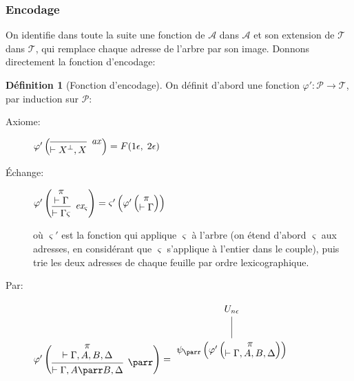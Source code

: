 \documentclass[11pt,a4paper]{article}
\theoremstyle{plain}
\theoremstyle{definition}
\newtheorem{definition}{Définition}
\theoremstyle{remark}
\newcommand*{\orth}{^\perp}
\newcommand*{\namedproofv}[2]{\hypo{#1}\infer[no rule]{1}{\vdash #2}}
\newcommand*{\axv}[1]{\infer{0}[\ensuremath{\mathit{ax}}]{\vdash #1}}
\newcommand*{\parrv}[1]{\infer{1}[\ensuremath{\parr}]{\vdash #1}}
\newcommand*{\permv}[2]{\infer{1}[\ensuremath{\textit{ex}_{#1}}]{\vdash #2}}
\newcommand*{\permapp}[2]{#2 #1}
\newcommand*{\someperm}{\varsigma}
\newcommand*{\sequent}{\Gamma}
\newcommand*{\sequentbis}{\Delta}
\newcommand*{\proofs}{\ensuremath{\mathcal{P}}}
\newcommand*{\addresses}{\ensuremath{\mathcal{A}}}
\newcommand*{\trees}{\ensuremath{\mathcal{T}}}
\newcommand*{\encode}{\ensuremath{\varphi}}
\begin{document}
\subsubsection{Encodage}

On identifie dans toute la suite une fonction de $\addresses$ dans $\addresses$ et son extension de $\trees$ dans $\trees$, qui remplace chaque adresse de l'arbre par son image. Donnons directement la fonction d'encodage:

\begin{definition}[Fonction d'encodage]
  On définit d'abord une fonction $\encode' : \proofs \rightarrow \trees$, par induction sur $\proofs$:
    \begin{description}
    \item[Axiome:]
    $\encode' \left(
    \begin{prooftree}
        \axv{{X}\orth, X}
    \end{prooftree}
    \right) = F(1 \epsilon, \; 2 \epsilon)$

    \item[Échange:]
    $\encode' \left(
    \begin{prooftree}
      \namedproofv{\pi}{\sequent}
      \permv{\someperm}{\permapp{\someperm}{\sequent}}
    \end{prooftree}
    \right) = \someperm' \left( \encode ' \left(
           \begin{prooftree}
             \namedproofv{\pi}{\sequent}
           \end{prooftree} \right) \right)$
           
    où $\someperm'$ est la fonction qui applique $\someperm$ à l'arbre (on étend d'abord $\someperm$ aux adresses, en considérant que $\someperm$ s'applique à l'entier dans le couple), puis trie les deux adresses de chaque feuille par ordre lexicographique.

    \item[Par:]
    $\encode' \left(
    \begin{prooftree}
      \namedproofv{\pi}{\sequent, A, B, \sequentbis}
      \parrv{\sequent, A \parr B, \sequentbis}
    \end{prooftree}
    \right) = \begin{tikzpicture}%
    [level distance=1.5cm,
    level 2/.style={sibling distance=3.5cm}]
    \node {$U_{n \epsilon}$}
        child {node {$\psi_\parr \left( \encode' \left(
           \begin{prooftree}
             \namedproofv{\pi}{\sequent, A, B, \sequentbis}
           \end{prooftree} \right) \right)$}
    };
    \end{tikzpicture}$
    

\end{description}
\end{definition}
\end{document}

